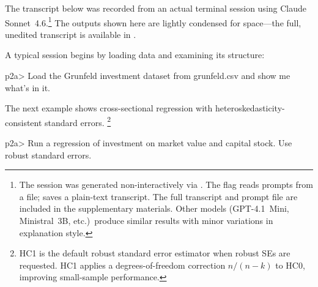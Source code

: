 The transcript below was recorded from an actual terminal session using
Claude Sonnet~4.6.\footnote{The session was generated non-interactively
via .  The  flag reads
prompts from a file;  saves a plain-text transcript.  The
full transcript and prompt file are included in the supplementary materials.
Other models (GPT-4.1~Mini, Ministral~3B, etc.)\ produce similar results
with minor variations in explanation style.}
The outputs shown here are lightly condensed for space---the full,
unedited transcript is available in .

A typical session begins by loading data and examining its structure:

\begin{Sinput}
p2a> Load the Grunfeld investment dataset from grunfeld.csv and show me
     what's in it.
\end{Sinput}


The next example shows cross-sectional regression with heteroskedasticity-consistent standard errors.%
\footnote{HC1 is the default robust standard error estimator when robust SEs are
requested. HC1 applies a degrees-of-freedom correction $n/(n-k)$ to HC0,
improving small-sample performance.}

\begin{Sinput}
p2a> Run a regression of investment on market value and capital stock.
     Use robust standard errors.
\end{Sinput}

